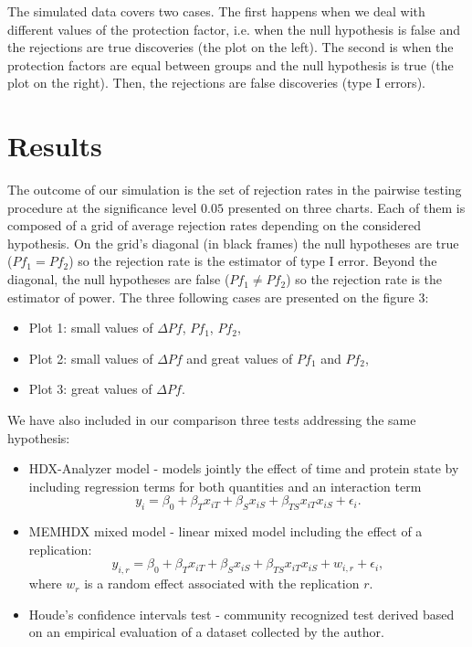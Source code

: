 \documentclass[]{MathAppl18}
\begin{document}
 The simulated data covers two cases. The first happens when we deal with different values of the protection factor, i.e. when the null hypothesis is false and the rejections are true discoveries (the plot on the left). The second is when the protection factors are equal between groups and the null hypothesis is true (the plot on the right). Then, the rejections are false discoveries (type I errors).

\section{Results}
The outcome of our simulation is the set of rejection rates in the pairwise testing procedure at the significance level $0.05$ presented on three charts. Each of them is composed of a grid of average rejection rates depending on the considered hypothesis. On the grid's diagonal (in black frames) the null hypotheses are true ($Pf_1 = Pf_2$) so the rejection rate is the estimator of type I error. Beyond the diagonal, the null hypotheses are false ($Pf_1 \neq Pf_2$) so the rejection rate is the estimator of power. The three following cases are presented on the figure 3:
\begin{itemize}
    \item Plot 1: small values of $\Delta Pf$, $Pf_1$, $Pf_2$,
    \item Plot 2: small values of  $\Delta Pf$ and great values of $Pf_1$ and $Pf_2$,
    \item Plot 3: great values of  $\Delta Pf$.
\end{itemize}

We have also included in our comparison three tests addressing the same hypothesis:

\begin{itemize}
    \item HDX-Analyzer model \citep{liu2011hdx} - models jointly the effect of time and protein state by including regression terms for both quantities and an interaction term
    \begin{equation}
    \label{deuteros}
        y_i = \beta_0 + \beta_T x_{iT} + \beta_S x_{iS} + \beta_{TS}x_{iT}x_{iS} + \epsilon_i.
    \end{equation}
    

    \item MEMHDX mixed model \citep{10.1093/bioinformatics/btw420} - linear mixed model including the effect of a replication:
     \begin{equation}
        y_{i, r} = \beta_0 + \beta_T x_{iT} + \beta_S x_{iS} + \beta_{TS}x_{iT}x_{iS} + w_{i,r} + \epsilon_i,
    \end{equation}
    where $w_r$ is a random effect associated with the replication $r$.
    
    
    \item Houde's confidence intervals test \citep{houde2011utility} - community recognized test derived based on an empirical evaluation of a dataset collected by the author.
\end{itemize}
\end{document}
